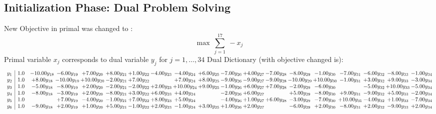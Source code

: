 \documentclass[9pt]{article}
\begin{document}
\subsection{Initialization Phase: Dual Problem Solving}
New Objective in primal was changed to : \[ \max\ \sum_{j=1}^{17}\ - x_j \] 
Primal variable $x_j$ corresponds to dual variable $y_j$ for $j = 1,\ldots,34$
Dual Dictionary (with objective changed is): 
\[\begin{array}{c| c c@{\hskip 2pt} c@{\hskip 2pt} c@{\hskip 2pt} c@{\hskip 2pt} c@{\hskip 2pt} c@{\hskip 2pt} c@{\hskip 2pt} c@{\hskip 2pt} c@{\hskip 2pt} c@{\hskip 2pt} c@{\hskip 2pt} c@{\hskip 2pt} c@{\hskip 2pt} c@{\hskip 2pt} c@{\hskip 2pt} c@{\hskip 2pt} c@{\hskip 2pt} }
 y_{1}   &  1.0 & -10.00 y_{18} & -6.00 y_{19} & +  7.00 y_{20} & +  8.00 y_{21} & +  1.00 y_{22} & -4.00 y_{23} & -4.00 y_{24} & +  6.00 y_{25} & -7.00 y_{26} & +  4.00 y_{27} & -7.00 y_{28} & -8.00 y_{29} & -1.00 y_{30} & -7.00 y_{31} & -6.00 y_{32} & -8.00 y_{33} & -1.00 y_{34}\\
 y_{2}   &  1.0 & +  8.00 y_{18} & -10.00 y_{19} & + 10.00 y_{20} & -2.00 y_{21} & +  7.00 y_{22} &   & +  7.00 y_{24} & +  8.00 y_{25} & -9.00 y_{26} & -9.00 y_{27} & -9.00 y_{28} & -10.00 y_{29} & + 10.00 y_{30} & -1.00 y_{31} & +  3.00 y_{32} & +  9.00 y_{33} & -3.00 y_{34}\\
 y_{3}   &  1.0 & -5.00 y_{18} & -8.00 y_{19} & +  2.00 y_{20} & -2.00 y_{21} & -2.00 y_{22} & +  2.00 y_{23} & + 10.00 y_{24} & +  9.00 y_{25} & -1.00 y_{26} & +  6.00 y_{27} & +  7.00 y_{28} & -2.00 y_{29} & -6.00 y_{30} &   & -5.00 y_{32} & + 10.00 y_{33} & -5.00 y_{34}\\
 y_{4}   &  1.0 & -8.00 y_{18} & -3.00 y_{19} & +  2.00 y_{20} & -8.00 y_{21} & +  3.00 y_{22} & +  6.00 y_{23} & +  4.00 y_{24} &   & -2.00 y_{26} & +  6.00 y_{27} &   & +  5.00 y_{29} & -8.00 y_{30} & +  9.00 y_{31} & -9.00 y_{32} & +  5.00 y_{33} & -2.00 y_{34}\\
 y_{5}   &  1.0  &   & +  7.00 y_{19} & -4.00 y_{20} & -1.00 y_{21} & +  7.00 y_{22} & +  8.00 y_{23} & +  5.00 y_{24} &   & -4.00 y_{26} & +  1.00 y_{27} & +  6.00 y_{28} & -3.00 y_{29} & -7.00 y_{30} & + 10.00 y_{31} & -4.00 y_{32} & +  1.00 y_{33} & -7.00 y_{34}\\
 y_{6}   &  1.0 & -9.00 y_{18} & +  2.00 y_{19} & +  1.00 y_{20} & +  5.00 y_{21} & -1.00 y_{22} & +  2.00 y_{23} & -1.00 y_{24} & +  3.00 y_{25} & +  1.00 y_{26} & +  2.00 y_{27} &   & -6.00 y_{29} & +  2.00 y_{30} & -8.00 y_{31} & +  2.00 y_{32} & -9.00 y_{33} & +  2.00 y_{34}\\

\end{array}\]
\end{document}
